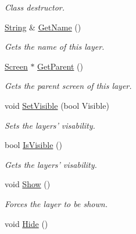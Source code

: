 \begin{DoxyCompactItemize}
\begin{DoxyCompactList}\small\item\em Class destructor. \item\end{DoxyCompactList}\item 
\hyperlink{namespacephys_aa03900411993de7fbfec4789bc1d392e}{String} \& \hyperlink{classphys_1_1UI_1_1Layer_a362edb47fdc9aa595dcaffc1ed617ae4}{GetName} ()
\begin{DoxyCompactList}\small\item\em Gets the name of this layer. \item\end{DoxyCompactList}\item 
\hyperlink{classphys_1_1UI_1_1Screen}{Screen} $\ast$ \hyperlink{classphys_1_1UI_1_1Layer_a484d10cf74177dea47d00ad7ddef8527}{GetParent} ()
\begin{DoxyCompactList}\small\item\em Gets the parent screen of this layer. \item\end{DoxyCompactList}\item 
void \hyperlink{classphys_1_1UI_1_1Layer_a421ed59dd2f50bed32a9e32c03327c39}{SetVisible} (bool Visible)
\begin{DoxyCompactList}\small\item\em Sets the layers' visability. \item\end{DoxyCompactList}\item 
bool \hyperlink{classphys_1_1UI_1_1Layer_a33f23515b8ac60adc2e99435574a2d9d}{IsVisible} ()
\begin{DoxyCompactList}\small\item\em Gets the layers' visability. \item\end{DoxyCompactList}\item 
\hypertarget{classphys_1_1UI_1_1Layer_ad8828d0c891ebbb9d7b9ca112793c725}{
void \hyperlink{classphys_1_1UI_1_1Layer_ad8828d0c891ebbb9d7b9ca112793c725}{Show} ()}
\label{classphys_1_1UI_1_1Layer_ad8828d0c891ebbb9d7b9ca112793c725}

\begin{DoxyCompactList}\small\item\em Forces the layer to be shown. \item\end{DoxyCompactList}\item 
\hypertarget{classphys_1_1UI_1_1Layer_ad69fc503170e52b2248f76a87f57a2b8}{
void \hyperlink{classphys_1_1UI_1_1Layer_ad69fc503170e52b2248f76a87f57a2b8}{Hide} ()}
\label{classphys_1_1UI_1_1Layer_ad69fc503170e52b2248f76a87f57a2b8}


\end{DoxyCompactItemize}
